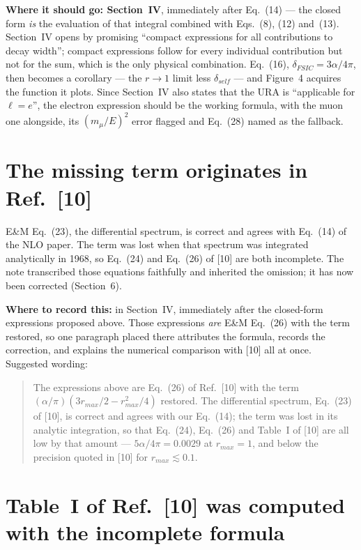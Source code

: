 \documentclass[11pt]{article}
\begin{document}
\textbf{Where it should go: Section~IV}, immediately after Eq.~(14) --- the closed
form \emph{is} the evaluation of that integral combined with Eqs.~(8), (12)
and~(13). Section~IV opens by promising ``compact expressions for all
contributions to decay width''; compact expressions follow for every individual
contribution but not for the sum, which is the only physical combination. Eq.~(16),
$\delta_{FSIC}=3\alpha/4\pi$, then becomes a corollary --- the $r\to1$ limit less
$\delta_{self}$ --- and Figure~4 acquires the function it plots. Since Section~IV
also states that the URA is ``applicable for $\ell=e$'', the electron expression
should be the working formula, with the muon one alongside, its
$(m_\mu/E)^{2}$ error flagged and Eq.~(28) named as the fallback.

\section{The missing term originates in Ref.~[10]}

E\&M Eq.~(23), the differential spectrum, is correct and agrees with Eq.~(14) of
the NLO paper. The term was lost when that spectrum was integrated analytically
in 1968, so Eq.~(24) and Eq.~(26) of [10] are both incomplete. The note
transcribed those equations faithfully and inherited the omission; it has now
been corrected (Section~6).

\textbf{Where to record this:} in Section~IV, immediately after the closed-form
expressions proposed above. Those expressions \emph{are} E\&M Eq.~(26) with the
term restored, so one paragraph placed there attributes the formula, records the
correction, and explains the numerical comparison with [10] all at once.
Suggested wording:

\begin{quote}
The expressions above are Eq.~(26) of Ref.~[10] with the term
$(\alpha/\pi)(3r_{max}/2-r_{max}^{2}/4)$ restored. The differential spectrum,
Eq.~(23) of [10], is correct and agrees with our Eq.~(14); the term was lost in
its analytic integration, so that Eq.~(24), Eq.~(26) and Table~I of [10] are all
low by that amount --- $5\alpha/4\pi=0.0029$ at $r_{max}=1$, and below the
precision quoted in [10] for $r_{max}\lesssim0.1$.
\end{quote}

\section{Table~I of Ref.~[10] was computed with the incomplete formula}
\end{document}
